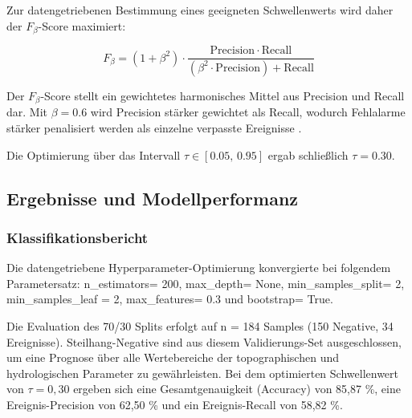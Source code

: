 \documentclass[../main.tex]{subfiles}
\begin{document}
Zur datengetriebenen Bestimmung eines geeigneten Schwellenwerts wird daher
der \(F_\beta\)-Score maximiert:

\[
    F_{\beta} = (1+\beta^{2}) \cdot \frac{\mathrm{Precision}\cdot \mathrm{Recall}}{(\beta^{2}\cdot \mathrm{Precision})+\mathrm{Recall}}
\]

Der \(F_\beta\)-Score stellt ein gewichtetes harmonisches Mittel aus
Precision und Recall dar.
Mit \( \beta = 0.6 \) wird Precision
stärker gewichtet als Recall, wodurch Fehlalarme stärker penalisiert
werden als einzelne verpasste Ereignisse \autocite{pedregosaScikitlearnMachineLearning2011}.

Die Optimierung über das Intervall \( \tau \in [0.05,\,0.95] \)
ergab schließlich \( \tau = 0.30 \).


\subsection{Ergebnisse und Modellperformanz}
\subsubsection{Klassifikationsbericht}

Die datengetriebene Hyperparameter-Optimierung konvergierte bei folgendem Parametersatz: n\_estimators= 200, max\_depth= None, min\_samples\_split= 2, min\_samples\_leaf
= 2, max\_features= 0.3 und bootstrap= True.


Die Evaluation des 70/30 Splits erfolgt auf n = 184 Samples (150 Negative, 34 Ereignisse).
Steilhang-Negative sind aus diesem Validierungs-Set ausgeschlossen, um eine Prognose über alle Wertebereiche der topographischen und hydrologischen Parameter zu gewährleisten.
Bei dem optimierten Schwellenwert von \(\tau=0,30\) ergeben sich eine Gesamtgenauigkeit (Accuracy) von 85,87 \%, eine Ereignis-Precision von 62,50 \% und ein Ereignis-Recall von 58,82 \%.
\end{document}
